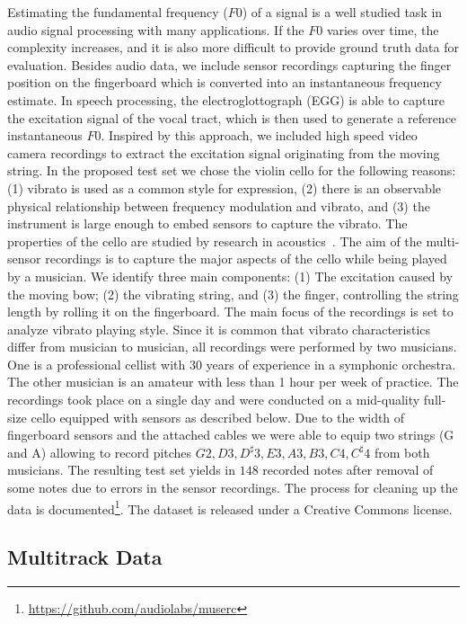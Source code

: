Estimating the fundamental frequency ($F0$) of a signal is a well studied task in audio signal processing with many applications. If the $F0$ varies over time, the complexity increases, and it is also more difficult to provide ground truth data for evaluation.
Besides audio data, we include sensor recordings capturing the finger position on the fingerboard which is converted into an instantaneous frequency estimate. In speech processing, the electroglottograph (EGG) is able to capture the excitation signal of the vocal tract, which is then used to generate a reference instantaneous $F0$.
Inspired by this approach, we included high speed video camera recordings to extract the excitation signal originating from the moving string.
In the proposed test set we chose the violin cello for the following reasons: (1) vibrato is used as a common style for expression, (2) there is an observable physical relationship between frequency modulation and vibrato, and (3) the instrument is large enough to embed sensors to capture the vibrato. The properties of the cello are studied by research in acoustics~\cite{woodhouse2004bowed, woodhouse1999torsional}.
The aim of the multi-sensor recordings is to capture the major aspects of the cello while being played by a musician. We identify three main components: (1) The excitation caused by the moving bow; (2) the vibrating string, and (3) the finger, controlling the string length by rolling it on the fingerboard.
The main focus of the recordings is set to analyze vibrato playing style. Since it is common that vibrato characteristics differ from musician to musician, all recordings were performed by two musicians. One is a professional cellist with 30 years of experience in a symphonic orchestra. The other musician is an amateur with less than 1 hour per week of practice. The recordings took place on a single day and were conducted on a mid-quality full-size cello equipped with sensors as described below. Due to the width of fingerboard sensors and the attached cables we were able to equip two strings (G and A) allowing to record pitches ${G2, D3, D^\sharp3, E3, A3, B3, C4, C^\sharp4}$ from both musicians. The resulting test set yields in $148$ recorded notes after removal of some notes due to errors in the sensor recordings. The process for cleaning up the data is documented\footnote{\url{https://github.com/audiolabs/muserc}}. The dataset is released under a Creative Commons license.

\subsection{Multitrack Data}


